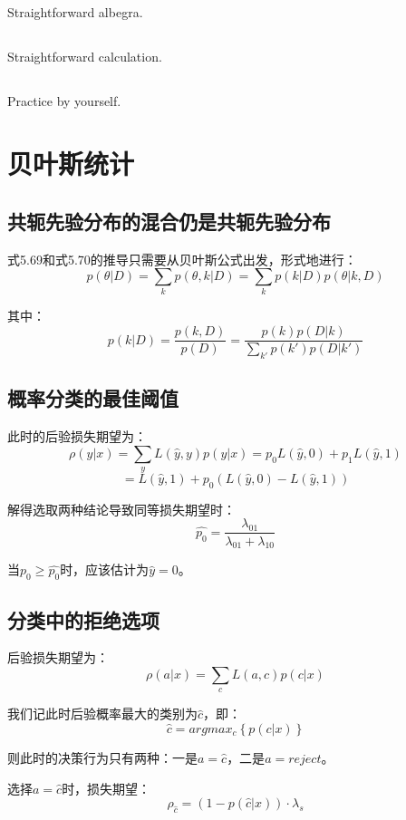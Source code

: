 \documentclass[UTF8]{ctexart}
\begin{document}
\subsection{}
Straightforward albegra.

\subsection{}
Straightforward calculation.

\subsection{}
Practice by yourself.

\newpage
\section{贝叶斯统计}
\subsection{共轭先验分布的混合仍是共轭先验分布}
式5.69和式5.70的推导只需要从贝叶斯公式出发，形式地进行：
$$p(\theta|D)=\sum_{k}p(\theta,k|D)=\sum_{k}p(k|D)p(\theta|k,D)$$

其中：
$$p(k|D)=\frac{p(k,D)}{p(D)}=\frac{p(k)p(D|k)}{\sum_{k'}p(k')p(D|k')}$$

\subsection{概率分类的最佳阈值}
此时的后验损失期望为：
$$\rho(\hat{y}|x)=\sum_{y}L(\hat{y},y)p(y|x)=p_{0}L(\hat{y},0)+p_{1}L(\hat{y},1)$$
$$=L(\hat{y},1)+p_{0}(L(\hat{y},0)-L(\hat{y},1))$$

解得选取两种结论导致同等损失期望时：
$$\hat{p_{0}}=\frac{\lambda_{01}}{\lambda_{01}+\lambda_{10}}$$

当$p_{0} \geq \hat{p_{0}}$时，应该估计为$\hat{y}=0$。

\subsection{分类中的拒绝选项}
后验损失期望为：
$$\rho(a|x)=\sum_{c}L(a,c)p(c|x)$$

我们记此时后验概率最大的类别为$\hat{c}$，即：
$$\hat{c}=argmax_{c} \left\{p(c|x)\right\}$$

则此时的决策行为只有两种：一是$a=\hat{c}$，二是$a=reject$。

选择$a=\hat{c}$时，损失期望：
$$\rho_{\hat{c}} = (1-p(\hat{c}|x))\cdot \lambda_{s}$$
\end{document}
